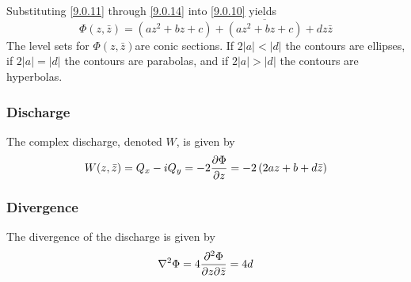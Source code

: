 \documentclass[12pt]{report}
\newcommand{\abs}[1]{\left\vert#1\right\vert}
\providecommand{\pderiv}[2]{\frac{\mathinner{\partial#1}}{\mathinner{\partial#2}}}
\providecommand{\pqderiv}[3]{\frac{\mathinner{\partial^2#1}}{\mathinner{\partial#2\partial#3}}}
\begin{document}
%
Substituting \eqref{9.0.11} through \eqref{9.0.14} into \eqref{9.0.10} yields
%
\begin{equation}\label{9.0.15}
\boxed{
    \Phi(z,\bar{z}) = \left( az^2 + bz + c \right) + \overline{\left(az^2 + bz + c\right)} + dz\bar{z}
}
\end{equation}
%
The level sets for $\Phi(z,\bar{z})$are conic sections. If $2 \abs{a} < \abs{d}$ the contours are ellipses, if $2\abs{a} = \abs{d}$ the contours are parabolas, and if $2\abs{a} > \abs{d}$ the contours are hyperbolas.

\subsubsection{Discharge}
The complex discharge, denoted $W$, is given by
%
\begin{equation}\label{9.0.16}
    W(z,\bar{z}) = Q_x - i Q_y = -2 \pderiv{\Phi}{z} = -2 \left( 2az + b + d\bar{z} \right)
\end{equation}

\subsubsection{Divergence}
The divergence of the discharge is given by
%
\begin{equation}\label{9.0.17}
    \nabla^2 \Phi = 4 \pqderiv{\Phi}{z}{\bar{z}} = 4d
\end{equation}


\newpage
\end{document}
